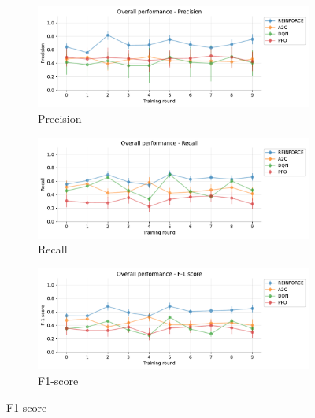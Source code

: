 \documentclass[a4paper, 12pt]{article}
\begin{document}
\begin{figure}[ht]
	\begin{subfigure}{\textwidth}
	\centering
	\includegraphics[width=\linewidth]{Overall_Pr.pdf}  
	\caption{Precision}
	\label{fig:tr-ovr-pr}
	\end{subfigure} \par\smallskip

	\begin{subfigure}{\textwidth}
	\centering
	\includegraphics[width=\linewidth]{Overall_Rc.pdf}  
	\caption{Recall}
	\label{fig:tr-ovr-rc}
	\end{subfigure} \par\smallskip
	
	\begin{subfigure}{\textwidth}
		\centering
		\includegraphics[width=\linewidth]{Overall_F1.pdf}  
		\caption{F1-score}
		\label{fig:tr-ovr-f1}
	\end{subfigure} \par\smallskip


\end{figure}
\end{document}
